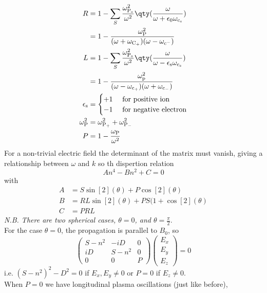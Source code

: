 \documentclass{book}         		                %
\begin{document}
\begin{align*}
  R &= 1 - \sum_S \frac{\omega^2_{\rm P_s}}{\omega^2} \qty( \frac{\omega}{\omega+\epsilon_0 \omega_{\rm c_s}}) \\
&= 1 - \frac{\omega_{\rm P}^2}{(\omega+\omega_{\rm C_+})(\omega-\omega_{\rm c^-})} \\
L &= 1 - \sum_S \frac{\omega_{\rm P_s}^2}{\omega^2} \qty(\frac{\omega}{\omega-\epsilon_{\rm s} \omega_{\rm c_s}}) \\
&= 1 - \frac{\omega_{\rm p}^2}{(\omega-\omega_{\rm c_+})(\omega+\omega_{\rm c_-})} \\
\epsilon_{\rm s} &=
\begin{cases}
  +1 & \text{ for positive ion } \\
  -1 & \text{ for negative electron}
\end{cases} \\
\omega_{\rm P}^2 &= \omega_{\rm P_+}^2 + \omega_{\rm P_{-}}^2 \\
P &= 1 - \frac{\omega_{\rm P}}{\omega^2}
\end{align*}
For a non-trivial electric field the determinant of the matrix must vanish, giving a relationship between $\omega$ and $k$ so th dispertion relation 
\begin{equation}
  \label{eq:dispertionrelation}
  An^4 - Bn^2 + C = 0
\end{equation}
with
\begin{align*}
  A &= S \sin[2](\theta) + P \cos[2](\theta) \\
B &= RL \sin[2](\theta) + PS (1 + \cos[2](\theta) \\
C &= PRL
\end{align*}
{\em N.B. There are two spherical cases, $\theta=0$, and $\theta= \frac{\pi}{2}$}.\\
For the case $\theta=0$, the propagation is parallel to $B_0$, so
\begin{equation*}
  \begin{pmatrix}
S-n^2 & -iD & 0 \\
iD & S-n^2 & 0 \\
0 & 0 & P 
\end{pmatrix}
\begin{pmatrix}
  E_x \\ E_y \\ E_z
\end{pmatrix} = 0
\end{equation*}
i.e. $(S-n^2)^2 - D^2 = 0$ if $E_x, E_y \neq 0$ or $ P=0$ if $E_z\neq
0$.\\
When $P=0$ we have longitudinal plasma oscillations (just like before),
\end{document}
